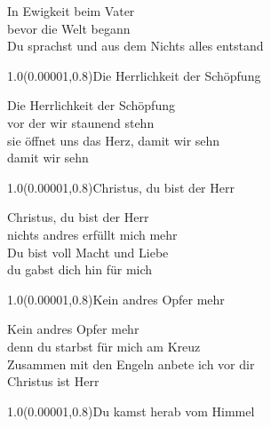 \documentclass[aspectratio=169]{beamer}
\begin{document}
\color{white}
\begin{frame}
\centering
\color{white}
\huge{In Ewigkeit beim Vater} \\
\huge{bevor die Welt begann} \\
\huge{Du sprachst und aus dem Nichts alles entstand} \\

\begin{textblock}{1.0}(0.00001,0.8)\color{gray}\normalsize{Die Herrlichkeit der Schöpfung}\end{textblock}
\end{frame}

\begin{frame}
\centering
\color{white}
\huge{Die Herrlichkeit der Schöpfung} \\
\huge{vor der wir staunend stehn} \\
\huge{sie öffnet uns das Herz, damit wir sehn} \\
\huge{damit wir sehn} \\

\begin{textblock}{1.0}(0.00001,0.8)\color{gray}\normalsize{Christus, du bist der Herr}\end{textblock}
\end{frame}

\begin{frame}
\centering
\color{white}
\huge{Christus, du bist der Herr} \\
\huge{nichts andres erfüllt mich mehr} \\
\huge{Du bist voll Macht und Liebe} \\
\huge{du gabst dich hin für mich} \\

\begin{textblock}{1.0}(0.00001,0.8)\color{gray}\normalsize{Kein andres Opfer mehr}\end{textblock}
\end{frame}

\begin{frame}
\centering
\color{white}
\huge{Kein andres Opfer mehr} \\
\huge{denn du starbst für mich am Kreuz} \\
\huge{Zusammen mit den Engeln anbete ich vor dir} \\
\huge{Christus ist Herr} \\

\begin{textblock}{1.0}(0.00001,0.8)\color{gray}\normalsize{Du kamst herab vom Himmel}\end{textblock}
\end{frame}
\end{document}
